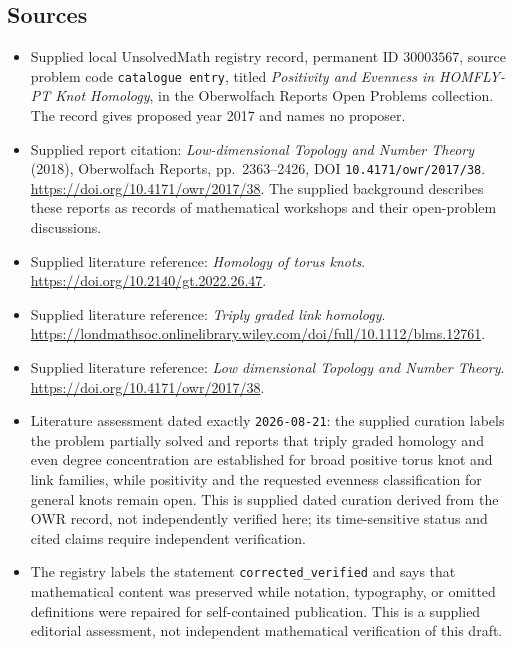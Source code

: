 \documentclass[11pt]{article}
\begin{document}
\subsection{Sources}
\begin{itemize}
\item Supplied local UnsolvedMath registry record, permanent ID \(30003567\), source problem code \texttt{catalogue entry}, titled \emph{Positivity and Evenness in HOMFLY-PT Knot Homology}, in the Oberwolfach Reports Open Problems collection. The record gives proposed year 2017 and names no proposer.
\item Supplied report citation: \emph{Low-dimensional Topology and Number Theory} (2018), Oberwolfach Reports, pp.\ 2363--2426, DOI \texttt{10.4171/owr/2017/38}. \url{https://doi.org/10.4171/owr/2017/38}. The supplied background describes these reports as records of mathematical workshops and their open-problem discussions.
\item Supplied literature reference: \emph{Homology of torus knots}. \url{https://doi.org/10.2140/gt.2022.26.47}.
\item Supplied literature reference: \emph{Triply graded link homology}. \url{https://londmathsoc.onlinelibrary.wiley.com/doi/full/10.1112/blms.12761}.
\item Supplied literature reference: \emph{Low dimensional Topology and Number Theory}. \url{https://doi.org/10.4171/owr/2017/38}.
\item Literature assessment dated exactly \texttt{2026-08-21}: the supplied curation labels the problem partially solved and reports that triply graded homology and even degree concentration are established for broad positive torus knot and link families, while positivity and the requested evenness classification for general knots remain open. This is supplied dated curation derived from the OWR record, not independently verified here; its time-sensitive status and cited claims require independent verification.
\item The registry labels the statement \texttt{corrected\_verified} and says that mathematical content was preserved while notation, typography, or omitted definitions were repaired for self-contained publication. This is a supplied editorial assessment, not independent mathematical verification of this draft.
\end{itemize}
\end{document}
